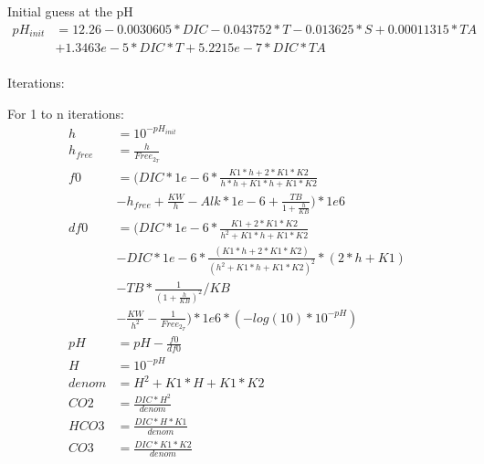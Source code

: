 \documentclass{ruthesis}
\begin{document}
Initial guess at the pH 
\begin{align*}
pH_{init} 	&= 12.26 -0.0030605*DIC -0.043752*T -0.013625*S+ 0.00011315*TA \nonumber \\
&+ 1.3463e-5*DIC*T + 5.2215e-7*DIC*TA \nonumber \\
\end{align*}

Iterations:

For 1 to n iterations:
\begin{align*}
h 			&=  10^{-pH_{init}}	\nonumber \\
h_{free} 	&=  \frac{h}{Free_{2_T}}	 \nonumber \\
f0 			&= (  DIC*1e-6*\frac{K1*h+2*K1*K2}{h*h+K1*h+K1*K2}    \nonumber\\
			&  - h_{free} + \frac{KW}{h} - Alk*1e-6 + \frac{TB}{1+\frac{h}{KB}} )*1e6 \nonumber  \\
df0 		&= (  DIC*1e-6*\frac{K1 +2*K1*K2}{h^2+K1*h+K1*K2}  \nonumber\\
			&  -DIC*1e-6*\frac{(K1*h+2*K1*K2)}{(h^2+K1*h+K1*K2)^2}*(2*h+K1)  \nonumber\\
			&  -TB *\frac{1}{(1+ \frac{h}{KB})^2} / KB   \nonumber \\
			&  -\frac{KW}{h^2} - \frac{1}{Free_{2_T}} )*1e6  * (-log(10)*10^{-pH}) \nonumber \\
pH 			&= pH - \frac{f0}{df0} \nonumber \\
H 			&= 10^{-pH} \nonumber \\
denom 		&= H^2+K1*H+K1*K2 \nonumber  \\
CO2  		&= \frac{DIC*H^2}{denom} \nonumber \\
HCO3 		&= \frac{DIC*H *K1}{denom} \nonumber \\
CO3  		&= \frac{DIC*K1*K2}{denom}      \nonumber \\                         
\end{align*}
\end{document}
